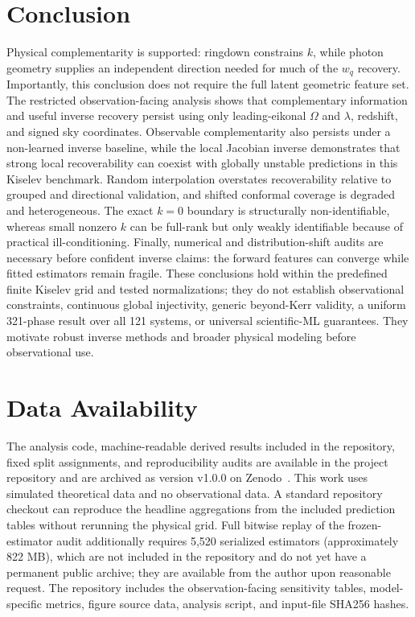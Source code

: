 \documentclass[11pt]{article}
\newcommand{\wq}{w_q}
\begin{document}
\section{Conclusion}
Physical complementarity is supported: ringdown constrains $k$, while photon
geometry supplies an independent direction needed for much of the $\wq$
recovery. Importantly, this conclusion does not require the full latent
geometric feature set. The restricted observation-facing analysis shows that
complementary information and useful inverse recovery persist using only
leading-eikonal $\Omega$ and $\lambda$, redshift, and signed sky coordinates.
Observable complementarity also persists under a non-learned inverse baseline,
while the local Jacobian inverse demonstrates that strong local recoverability
can coexist with globally unstable predictions in this Kiselev benchmark. Random interpolation overstates recoverability relative to grouped
and directional validation, and shifted conformal coverage is degraded and
heterogeneous. The exact $k=0$ boundary is structurally
non-identifiable, whereas small nonzero $k$ can be full-rank but only weakly
identifiable because of practical ill-conditioning. Finally, numerical and
distribution-shift audits are necessary before confident inverse claims: the
forward features can converge while fitted estimators remain fragile. These
conclusions hold within the predefined finite Kiselev grid and tested
normalizations; they do not establish observational constraints, continuous
global injectivity, generic beyond-Kerr validity, a uniform 321-phase result
over all 121 systems, or universal scientific-ML guarantees. They motivate
robust inverse methods and broader physical modeling before observational use.

\section*{Data Availability}
The analysis code, machine-readable derived results included in the repository, fixed
split assignments, and reproducibility audits are available in the project
repository and are archived as version v1.0.0 on Zenodo~\cite{palomino2026software}. This work uses simulated theoretical data and no observational
data. A standard repository checkout can reproduce the headline aggregations from the included
prediction tables without rerunning the physical grid. Full bitwise replay of
the frozen-estimator audit additionally requires 5,520 serialized estimators
(approximately 822 MB), which are not included in the repository
and do not yet have a permanent public archive; they are available from the
author upon reasonable request.
The repository includes the observation-facing sensitivity tables,
model-specific metrics, figure source data, analysis script, and input-file
SHA256 hashes.
\end{document}
